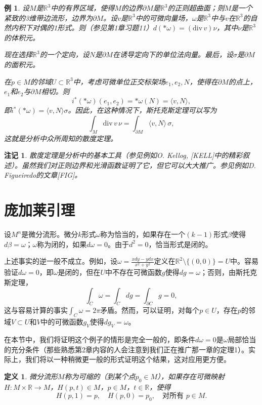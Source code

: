 \documentclass[12pt,a4paper]{ctexbook}
\newtheorem{definition}[theorem]{定义}
\newtheorem{remark}[theorem]{注记}
\newtheorem{example}[theorem]{例}
\begin{document}
\begin{example}
设$M$是$\mathbb{R}^3$中的有界区域，使得$M$的边界$\partial M$是$\mathbb{R}^3$的正则超曲面；则$M$是一个紧致的3维带边流形，边界为$\partial M$。设$v$是$\mathbb{R}^3$中的可微向量场，$\omega$是$\mathbb{R}^3$中与$v$在$\mathbb{R}^3$的自然内积下对偶的1形式。则（参见第1章习题11）$d(*\omega) = (\text{div}\,v)\nu$，其中$\nu$是$\mathbb{R}^3$的体积元。

现在选择$\mathbb{R}^3$的一个定向，设$N$是$\partial M$在诱导定向下的单位法向量。最后，设$\sigma$是$\partial M$的面积元。

在$p\in M$的邻域$U\subset\mathbb{R}^3$中，考虑可微单位正交标架场$e_1,e_2,N$，使得在$\partial M$的点上，$e_1$和$e_2$与$\partial M$相切。则
$$i^*(*\omega)(e_1,e_2) = *\omega(N) = \langle v, N\rangle,$$
即$i^*(*\omega) = \langle v, N\rangle\sigma$。因此，在这种情况下，斯托克斯定理可以写为
$$\int_M \text{div}\,v\,\nu = \int_{\partial M} \langle v, N\rangle\,\sigma,$$
这就是分析中众所周知的散度定理。
\end{example}

\begin{remark}
散度定理是分析中的基本工具（参见例如O. Kellog, [KELL]中的精彩叙述）。虽然我们对正则边界和光滑函数证明了它，但它可以大大推广。参见例如D. Figueiredo的文章[FIG]。
\end{remark}

\section{庞加莱引理}

设$M^n$是微分流形。微分$k$形式$\omega$称为恰当的，如果存在一个$(k-1)$形式$\beta$使得$d\beta = \omega$；$\omega$称为闭的，如果$d\omega = 0$。由于$d^2=0$，恰当形式是闭的。

上述事实的逆一般不成立。例如，设$\omega = \frac{xdy - ydx}{x^2+y^2}$定义在$\mathbb{R}^2\setminus\{(0,0)\}=U$中。容易验证$d\omega = 0$，即$\omega$是闭的，但在$U$中不存在可微函数$g$使得$dg = \omega$；否则，由斯托克斯定理，
$$\int_C \omega = \int_C dg = \int_{\partial C} g = 0,$$
这与容易计算的事实$\int_C \omega = 2\pi$矛盾。然而，可以证明，对每个$p\in U$，存在$p$的邻域$V\subset U$和$V$中的可微函数$g_V$使得$dg_V = \omega$。

在本节中，我们将证明这个例子的情形是完全一般的，即条件$d\omega=0$是$\omega$局部恰当的充分条件（那些熟悉第2章内容的人会注意到我们正在推广那一章的定理1）。实际上，我们将以一种稍微更一般的形式证明这个结果，这对应用更方便。

\begin{definition}
微分流形$M$称为可缩的（到某个点$p_0\in M$），如果存在可微映射$H:M\times\mathbb{R}\to M$，$H(p,t)\in M$，$p\in M$，$t\in\mathbb{R}$，使得
$$H(p,1) = p,\quad H(p,0) = p_0,\quad \text{对所有 } p\in M.$$
\end{definition}
\end{document}
